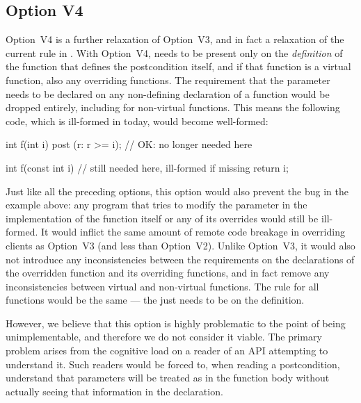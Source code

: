 \subsection*{Option V4}

Option~V4 is a further relaxation of Option~V3, and in fact a relaxation of the current rule in \cite{P2900R10}. With Option~V4,  needs to be present only on the \emph{definition} of the function that defines the postcondition itself, and if that function is a virtual function, also any overriding functions. The requirement that the parameter needs to be declared  on any non-defining declaration of a function would be dropped entirely, including for non-virtual functions. This means the following code, which is ill-formed in \cite{P2900R10} today, would become well-formed:

\begin{codeblock}
int f(int i) post (r: r >=  i);  // OK:  no longer needed here

int f(const int i) {  //  still needed here, ill-formed if missing
  return i;
}
\end{codeblock}
Just like all the preceding options, this option would also prevent the bug in the example above: any program that tries to modify the parameter in the implementation of the function itself or any of its overrides would still be ill-formed. It would inflict the same amount of remote code breakage in overriding clients as Option~V3 (and less than Option~V2). Unlike Option~V3, it would also not introduce any inconsistencies between the requirements on the declarations of the overridden function and its overriding functions, and in fact remove any inconsistencies between virtual and non-virtual functions. The rule for all functions would be the same --- the  just needs to be on the definition.

However, we believe that this option is highly problematic to the point of being unimplementable, and therefore we do not consider it viable.  The primary problem arises from the cognitive load on a reader of an API attempting to understand it.  Such readers would be forced to, when reading a postcondition, understand that parameters will be treated as  in the function body without actually seeing that information in the declaration.  

